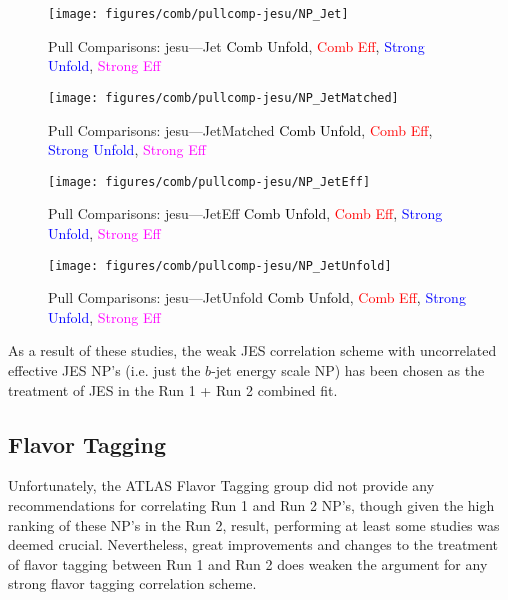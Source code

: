 \begin{figure}[!htbp]\captionsetup{justification=centering}
\centering
\texttt{[image: figures/comb/pullcomp-jesu/NP\_Jet]}
  \caption{Pull Comparisons: jesu---Jet  \textcolor{black}{Comb Unfold}, \textcolor{red}{Comb Eff}, \textcolor{blue}{Strong Unfold}, \textcolor{magenta}{Strong Eff}}
  \label{fig:PullComparisons:jesu---Jet}  
\end{figure}

\begin{figure}[!htbp]\captionsetup{justification=centering}
\centering
\texttt{[image: figures/comb/pullcomp-jesu/NP\_JetMatched]}
  \caption{Pull Comparisons: jesu---JetMatched  \textcolor{black}{Comb Unfold}, \textcolor{red}{Comb Eff}, \textcolor{blue}{Strong Unfold}, \textcolor{magenta}{Strong Eff}}
  \label{fig:PullComparisons:jesu---JetMatched}
\end{figure}

\begin{figure}[!htbp]\captionsetup{justification=centering}
\centering
\texttt{[image: figures/comb/pullcomp-jesu/NP\_JetEff]}
  \caption{Pull Comparisons: jesu---JetEff  \textcolor{black}{Comb Unfold}, \textcolor{red}{Comb Eff}, \textcolor{blue}{Strong Unfold}, \textcolor{magenta}{Strong Eff}}
  \label{fig:PullComparisons:jesu---JetEff}
\end{figure}

\begin{figure}[!htbp]\captionsetup{justification=centering}
\centering
\texttt{[image: figures/comb/pullcomp-jesu/NP\_JetUnfold]}
  \caption{Pull Comparisons: jesu---JetUnfold  \textcolor{black}{Comb Unfold}, \textcolor{red}{Comb Eff}, \textcolor{blue}{Strong Unfold}, \textcolor{magenta}{Strong Eff}}
  \label{fig:PullComparisons:jesu---JetUnfold}
\end{figure}

As a result of these studies, the weak JES correlation scheme with uncorrelated effective JES NP's (i.e. just the $b$-jet energy scale NP) has been chosen as the treatment of JES in the Run 1 + Run 2 combined fit.


\subsection{Flavor Tagging}
\label{sec:ft}
Unfortunately, the ATLAS Flavor Tagging group did not provide any recommendations for correlating Run 1 and Run 2 NP's, though given the high ranking of these NP's in the Run 2, result, performing at least some studies was deemed crucial.  Nevertheless, great improvements and changes to the treatment of flavor tagging between Run 1 and Run 2 does weaken the argument for any strong flavor tagging correlation scheme.

